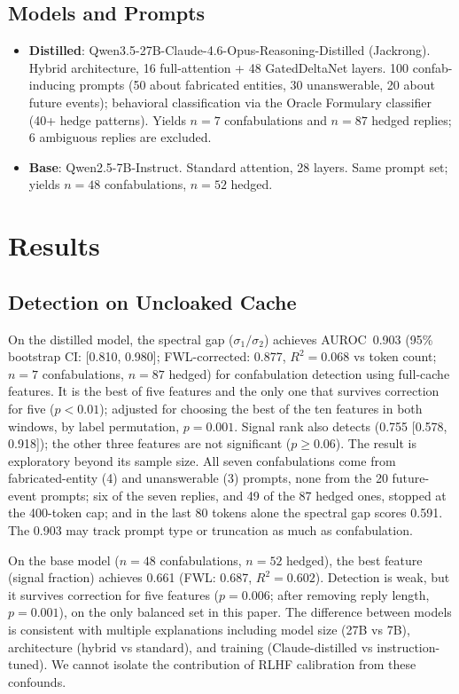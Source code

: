 \subsection{Models and Prompts}

\begin{itemize}
\item \textbf{Distilled}: Qwen3.5-27B-Claude-4.6-Opus-Reasoning-Distilled
(Jackrong). Hybrid architecture, 16 full-attention + 48 GatedDeltaNet
layers. 100 confab-inducing prompts (50 about fabricated entities, 30
unanswerable, 20 about future events); behavioral classification via the
Oracle Formulary classifier (40+ hedge patterns). Yields $n=7$
confabulations and $n=87$ hedged replies; 6 ambiguous replies are
excluded.

\item \textbf{Base}: Qwen2.5-7B-Instruct. Standard attention, 28
layers. Same prompt set; yields $n=48$ confabulations, $n=52$ hedged.
\end{itemize}

\section{Results}

\subsection{Detection on Uncloaked Cache}
\label{sec:uncloaked}

On the distilled model, the spectral gap ($\sigma_1/\sigma_2$) achieves
AUROC~0.903 (95\% bootstrap CI: [0.810, 0.980]; FWL-corrected: 0.877,
$R^2 = 0.068$ vs token count; $n=7$ confabulations, $n=87$ hedged)
for confabulation detection using full-cache features. It is the best of
five features and the only one that survives correction for five
($p < 0.01$); adjusted for choosing the best of the ten features in both
windows, by label permutation, $p = 0.001$. Signal rank also detects
(0.755 [0.578, 0.918]); the other three features are not significant
($p \geq 0.06$). The result is exploratory beyond its sample size. All
seven confabulations come from fabricated-entity (4) and unanswerable (3)
prompts, none from the 20 future-event prompts; six of the seven replies,
and 49 of the 87 hedged ones, stopped at the 400-token cap; and in the
last 80 tokens alone the spectral gap scores 0.591. The 0.903 may track
prompt type or truncation as much as confabulation.

On the base model ($n=48$ confabulations, $n=52$ hedged), the best
feature (signal fraction) achieves 0.661 (FWL: 0.687, $R^2 = 0.602$).
Detection is weak, but it survives correction for five features
($p = 0.006$; after removing reply length, $p = 0.001$), on the only
balanced set in this paper. The difference between models is consistent
with multiple explanations including model size (27B vs 7B), architecture
(hybrid vs standard), and training (Claude-distilled vs
instruction-tuned). We cannot isolate the contribution of RLHF
calibration from these confounds.

